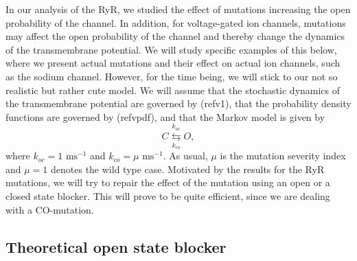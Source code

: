 In our analysis of the RyR, we studied the effect of mutations increasing the 
open probability of the channel. In addition, for voltage-gated ion
channels, mutations may affect the open probability of the channel and thereby
change the dynamics of the transmembrane potential. We will study specific
examples of this below, where we present actual mutations and their effect on
actual ion channels, such as the sodium channel. However, for the time being,
we will stick to our not so realistic but rather cute model. We will assume 
that the stochastic dynamics of the transmembrane potential are governed by 
(ref{v1}),  that the probability density functions are governed by
(ref{vpdf}), and that the Markov model is given by
\begin{equation}
C\underset{k_{co}}{\overset{k_{oc}}{\leftrightarrows}}O,
\end{equation}
where $k_{oc}=1 \text{ ms}^{-1}$ and $k_{co}=\mu\text{ ms}^{-1}.$ 
As usual,  $\mu$ is the mutation severity
index and $\mu=1$ denotes the wild type case. 
Motivated by the results for the RyR mutations,
we will try to repair the effect of the mutation using an open or a closed
state blocker. This will prove to be quite efficient, since we are dealing with a CO-mutation.

\bigskip

\subsection{Theoretical open state blocker}

